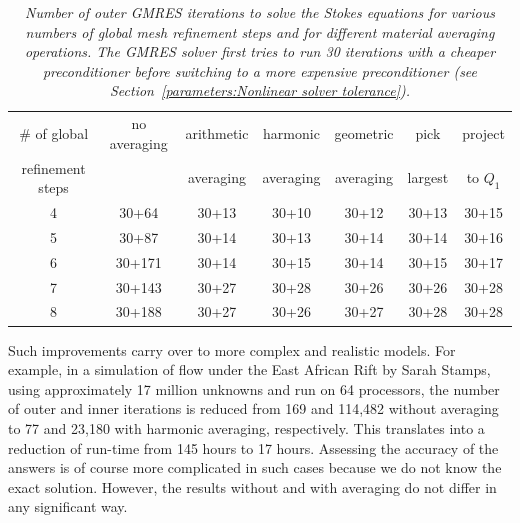 \documentclass{article}
\begin{document}
\begin{table}[htb]
  \center
  \begin{tabular}{|c|cccccc|}
    \hline
    \# of global & no averaging & arithmetic & harmonic & geometric
    & pick & project \\
    refinement steps & & averaging & averaging &
    averaging & largest & to $Q_1$
    \\ \hline
    4          & 30+64   & 30+13      & 30+10    & 30+12 & 30+13 & 30+15 \\
    5          & 30+87   & 30+14      & 30+13    & 30+14 & 30+14 & 30+16 \\
    6          & 30+171  & 30+14      & 30+15    & 30+14 & 30+15 & 30+17 \\
    7          & 30+143  & 30+27      & 30+28    & 30+26 & 30+26 & 30+28 \\
    8          & 30+188  & 30+27      & 30+26    & 30+27 & 30+28 & 30+28 \\ \hline
  \end{tabular}
  \caption{\it Number of outer GMRES iterations to solve the Stokes equations
  for various numbers of global mesh refinement steps and for different
  material averaging operations. The GMRES solver first tries to run 30
  iterations with a cheaper preconditioner before switching to a more expensive
  preconditioner (see Section~\ref{parameters:Nonlinear solver tolerance}).}
  \label{tab:sinker-with-averaging-iteration-counts}
\end{table}
Such improvements carry over to more complex and realistic models. For
example, in a simulation of flow under the East African Rift by Sarah Stamps,
using approximately 17 million unknowns and run on 64 processors, the number
of outer and inner iterations is reduced from 169 and 114,482 without
averaging to 77 and 23,180 with harmonic averaging, respectively.
This translates into a reduction of run-time from 145 hours to 17
hours. Assessing the accuracy of the answers is of course more complicated in
such cases because we do not know the exact solution. However, the results
without and with averaging do not differ in any significant way.
\end{document}
